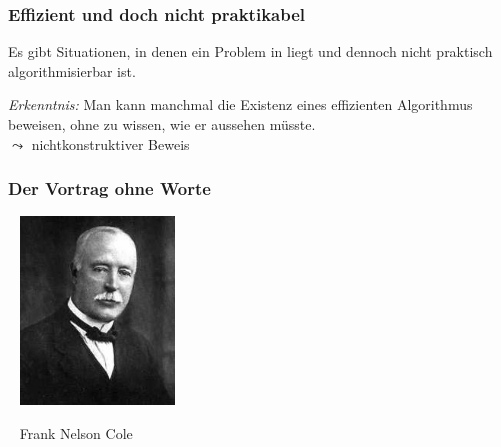 \documentclass[onlymath]{beamer}
\begin{document}
\begin{frame}\frametitle{Effizient und doch nicht praktikabel}

Es gibt Situationen, in denen ein Problem in  liegt 
und dennoch nicht praktisch algorithmisierbar ist.\medskip

\bigskip\pause

\pause

\emph{Erkenntnis:} Man kann manchmal die Existenz eines effizienten Algorithmus beweisen,
ohne zu wissen, wie er aussehen müsste.\\
$\leadsto$ \alert{nichtkonstruktiver Beweis}


\end{frame}


\begin{frame}\frametitle{Der Vortrag ohne Worte}

~\hfill
\includegraphics[height=5cm]{images/Cole}
\hfill~

~\hfill
Frank Nelson Cole
\hfill~

\end{frame}
\end{document}
